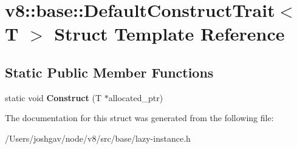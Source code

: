 \hypertarget{structv8_1_1base_1_1_default_construct_trait}{}\section{v8\+:\+:base\+:\+:Default\+Construct\+Trait$<$ T $>$ Struct Template Reference}
\label{structv8_1_1base_1_1_default_construct_trait}
\subsection*{Static Public Member Functions}
\begin{DoxyCompactItemize}
\item 
static void {\bfseries Construct} (T $\ast$allocated\+\_\+ptr)\hypertarget{structv8_1_1base_1_1_default_construct_trait_a6e1a44505e784bdb63fc984c4167b149}{}\label{structv8_1_1base_1_1_default_construct_trait_a6e1a44505e784bdb63fc984c4167b149}

\end{DoxyCompactItemize}


The documentation for this struct was generated from the following file\+:\begin{DoxyCompactItemize}
\item 
/\+Users/joshgav/node/v8/src/base/lazy-\/instance.\+h\end{DoxyCompactItemize}
